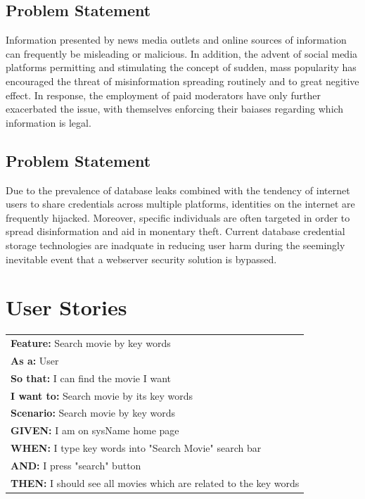 \documentclass{article}
\begin{document}
\subsection{Problem Statement}
Information presented by news media outlets and online sources of information
can frequently be misleading or malicious. In addition, the advent of social
media platforms permitting and stimulating the concept of sudden, mass 
popularity has encouraged the threat of misinformation spreading routinely and
to great negitive effect. In response, the employment of paid moderators have
only further exacerbated the issue, with themselves enforcing their baiases
regarding which information is legal.
\subsection{Problem Statement}
Due to the prevalence of database leaks combined with the tendency of internet
users to share credentials across multiple platforms, identities on the internet
are frequently hijacked. Moreover, specific individuals are often targeted in
order to spread disinformation and aid in monentary theft. Current database
credential storage technologies are inadquate in reducing user harm during the
seemingly inevitable event that a webserver security solution is bypassed.

\section{User Stories}
\begin{table}[h]
\begin{tabular}{|l|}
\hline
\textbf{Feature:} Search movie by key words   \\
\textbf{As a:} User\\
\textbf{So that:} I can find the movie I want\\
\textbf{I want to:} Search movie by its key words\\
\textbf{Scenario:} Search movie by key words\\
\textbf{GIVEN:} I am on sysName home page\\
\textbf{WHEN:} I type key words into "Search Movie" search bar\\
\textbf{AND:} I press "search" button\\
\textbf{THEN:} I should see all movies which are related to the key words\\
\hline
\end{tabular}
\end{table}
\end{document}
